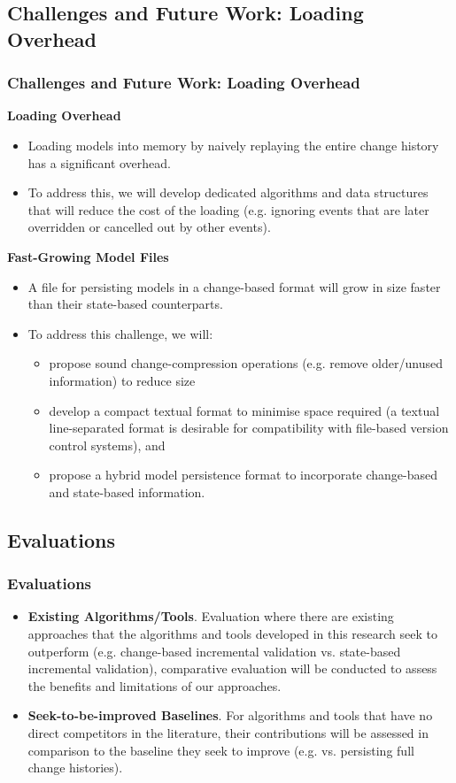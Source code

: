 \documentclass{beamer}
\begin{document}
\begin{frame}
\section{Challenges and Future Work: Loading Overhead}
\frametitle{Challenges and Future Work: Loading Overhead}
\textbf{Loading Overhead}
\begin{itemize}
\item Loading models into memory by naively replaying the entire change history has a significant overhead. \item To address this, we will develop dedicated algorithms and data structures that will reduce the cost of the loading (e.g. ignoring events that are later overridden or cancelled out by other events). 
\end{itemize}
\end{frame}

\begin{frame}
\textbf{Fast-Growing Model Files}
\begin{itemize}
\item A file for persisting models in a change-based format will grow in size faster than their state-based counterparts. 
\item To address this challenge, we will:
\begin{itemize}
\item propose sound change-compression operations (e.g. remove older/unused information) to reduce size\
\item  develop a compact textual format to minimise space required (a textual line-separated format is desirable for compatibility with file-based version control systems), and 
\item propose a hybrid model persistence format to incorporate change-based and state-based information. 
\end{itemize}
\end{itemize}
\end{frame}


\begin{frame}
\section{Evaluations}
\frametitle{Evaluations}
\begin{itemize}
\item \textbf{Existing Algorithms/Tools}. Evaluation where there are existing approaches that the algorithms and tools developed in this research seek to outperform (e.g. change-based incremental validation vs. state-based incremental validation), comparative evaluation will be conducted to assess the benefits and limitations of our approaches. 
\item \textbf{Seek-to-be-improved Baselines}. For algorithms and tools that have no direct competitors in the literature, their contributions will be assessed in comparison to the baseline they seek to improve (e.g. vs. persisting full change histories).
\end{itemize}
\end{frame}
\end{document}
